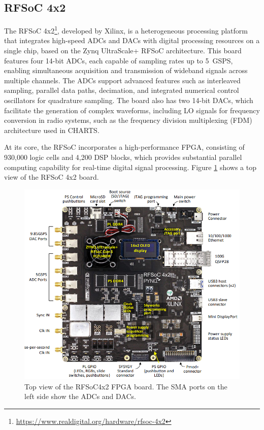 \subsection{RFSoC 4x2}
\label{sec:rfsoc}
The RFSoC 4x2\footnote{\url{https://www.realdigital.org/hardware/rfsoc-4x2}}, developed by Xilinx, is a heterogeneous processing platform that integrates high-speed ADCs and DACs with digital processing resources on a single chip, based on the Zynq UltraScale+ RFSoC architecture. This board features four 14-bit ADCs, each capable of sampling rates up to 5~GSPS, enabling simultaneous acquisition and transmission of wideband signals across multiple channels. The ADCs support advanced features such as interleaved sampling, parallel data paths, decimation, and integrated numerical control oscillators for quadrature sampling. The board also has two 14-bit DACs, which facilitate the generation of complex waveforms, including LO signals for frequency conversion in radio systems, such as the frequency division multiplexing (FDM) architecture used in CHARTS.

At its core, the RFSoC incorporates a high-performance FPGA, consisting of 930,000 logic cells and 4,200 DSP blocks, which provides substantial parallel computing capability for real-time digital signal processing. Figure \ref{fig:rfsoc_top_view} shows a top view of the RFSoC 4x2 board.
\begin{figure}
	\centering
	\includegraphics[scale=0.58]{../figures/rfsoc.png}
	\caption[RFSoC4x2 top view]{Top view of the RFSoC4x2 FPGA board. The SMA ports on the left side show the ADCs and DACs.}
	\label{fig:rfsoc_top_view}
\end{figure}